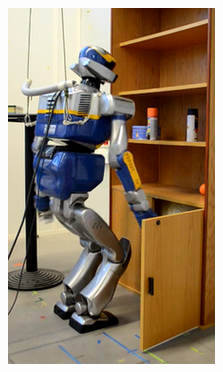 \begin{figure}
\begin{subfigure}{0.19\columnwidth}
    \includegraphics[width = \columnwidth]
                    {src/chap3-optimal-motion-planning/figure/shelves-2.png}
    \label{shelves-2}
  \end{subfigure}
  \begin{subfigure}{0.19\columnwidth}
    \centering

\end{subfigure}
\end{figure}
